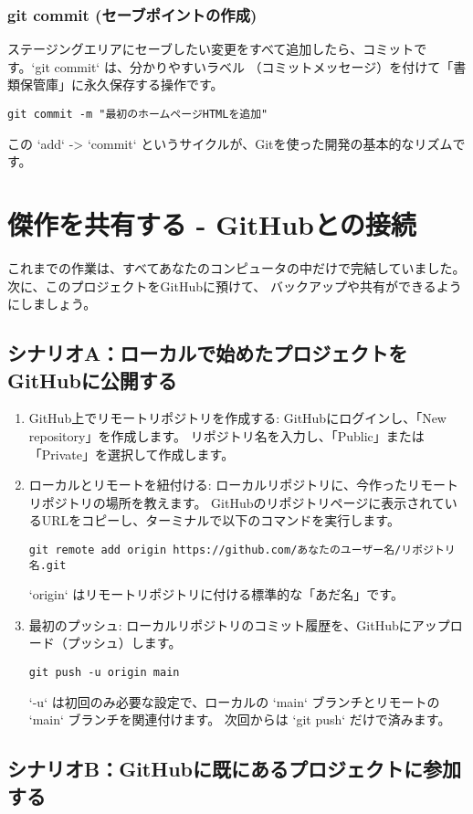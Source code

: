 \documentclass{ltjsarticle}
\begin{document}
\subsubsection{git commit (セーブポイントの作成)}
ステージングエリアにセーブしたい変更をすべて追加したら、コミットです。`git commit` は、分かりやすいラベル
（コミットメッセージ）を付けて「書類保管庫」に永久保存する操作です。
\begin{verbatim}
git commit -m "最初のホームページHTMLを追加"
\end{verbatim}
この `add` -> `commit` というサイクルが、Gitを使った開発の基本的なリズムです。

\section{傑作を共有する - GitHubとの接続}
これまでの作業は、すべてあなたのコンピュータの中だけで完結していました。次に、このプロジェクトをGitHubに預けて、
バックアップや共有ができるようにしましょう。

\subsection{シナリオA：ローカルで始めたプロジェクトをGitHubに公開する}
\begin{enumerate}
    \item GitHub上でリモートリポジトリを作成する: GitHubにログインし、「New repository」を作成します。
		リポジトリ名を入力し、「Public」または「Private」を選択して作成します。
    \item ローカルとリモートを紐付ける: ローカルリポジトリに、今作ったリモートリポジトリの場所を教えます。
		GitHubのリポジトリページに表示されているURLをコピーし、ターミナルで以下のコマンドを実行します。
    \begin{verbatim}
git remote add origin https://github.com/あなたのユーザー名/リポジトリ名.git
\end{verbatim}
    `origin` はリモートリポジトリに付ける標準的な「あだ名」です。
    \item 最初のプッシュ: ローカルリポジトリのコミット履歴を、GitHubにアップロード（プッシュ）します。
    \begin{verbatim}
git push -u origin main
\end{verbatim}
    `-u` は初回のみ必要な設定で、ローカルの `main` ブランチとリモートの `main` ブランチを関連付けます。
		次回からは `git push` だけで済みます。
\end{enumerate}

\subsection{シナリオB：GitHubに既にあるプロジェクトに参加する}
\end{document}
